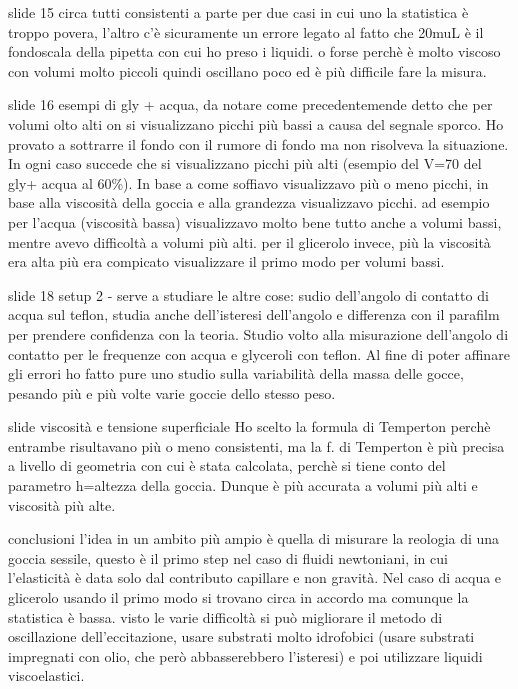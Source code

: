 \documentclass[letterpaper,12pt]{article}
\begin{document}
slide 15 
circa tutti consistenti a parte per due casi in cui uno la statistica è troppo povera, l'altro c'è sicuramente un errore legato al fatto che 20muL è il fondoscala della pipetta con cui ho preso i liquidi.
o forse perchè è molto viscoso con volumi molto piccoli quindi oscillano poco ed è più difficile fare la misura.

slide 16
esempi di gly + acqua, da notare come precedentemende detto che per volumi olto alti on si visualizzano picchi più bassi a causa del segnale sporco. Ho provato a sottrarre il fondo con il rumore di fondo ma non risolveva la situazione. In ogni caso succede che si visualizzano picchi più alti (esempio del V=70 del gly+ acqua al 60\%).
 In base a come soffiavo visualizzavo più o meno picchi, in base alla viscosità della goccia e alla grandezza visualizzavo picchi.
 ad esempio per l'acqua (viscosità bassa) visualizzavo molto bene tutto anche a volumi bassi, mentre avevo difficoltà a volumi più alti. per il glicerolo invece, più la viscosità era alta più era compicato visualizzare il primo modo per volumi bassi.
 
 slide 18
 setup 2 - serve a studiare le altre cose: sudio dell'angolo di contatto di acqua sul teflon, studia anche dell'isteresi dell'angolo e differenza con il parafilm per prendere confidenza con la teoria. Studio volto alla misurazione dell'angolo di contatto per le frequenze con acqua e glyceroli con teflon.
 Al fine di poter affinare gli errori ho fatto pure uno studio sulla variabilità della massa delle gocce, pesando più e più volte varie goccie dello stesso peso.
 
 slide viscosità e tensione superficiale
 Ho scelto la formula di Temperton perchè entrambe risultavano più o meno consistenti, ma la f. di Temperton è più precisa a livello di geometria con cui è stata calcolata, perchè si tiene conto del parametro h=altezza della goccia. Dunque è più accurata a volumi più alti e viscosità più alte. 
 
 conclusioni
 l'idea in un ambito più ampio è quella di misurare la reologia di una goccia sessile, questo è il primo step nel caso di fluidi newtoniani, in cui l'elasticità è data solo dal contributo capillare e non gravità. Nel caso di acqua e glicerolo usando il primo modo si trovano circa in accordo ma comunque la statistica è bassa. visto le varie difficoltà si può migliorare il metodo di oscillazione dell'eccitazione, usare substrati molto idrofobici (usare substrati impregnati con olio, che però abbasserebbero l'isteresi) e poi utilizzare liquidi viscoelastici.
 
 
 
\end{document}
